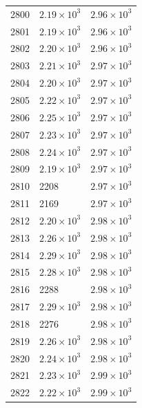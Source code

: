 \begin{table}[H]
\begin{tabular}{lll}
2800 & $\displaystyle 2.19 \times 10^{3}$ & $\displaystyle 2.96 \times 10^{3}$ \\
2801 & $\displaystyle 2.19 \times 10^{3}$ & $\displaystyle 2.96 \times 10^{3}$ \\
2802 & $\displaystyle 2.20 \times 10^{3}$ & $\displaystyle 2.96 \times 10^{3}$ \\
2803 & $\displaystyle 2.21 \times 10^{3}$ & $\displaystyle 2.97 \times 10^{3}$ \\
2804 & $\displaystyle 2.20 \times 10^{3}$ & $\displaystyle 2.97 \times 10^{3}$ \\
2805 & $\displaystyle 2.22 \times 10^{3}$ & $\displaystyle 2.97 \times 10^{3}$ \\
2806 & $\displaystyle 2.25 \times 10^{3}$ & $\displaystyle 2.97 \times 10^{3}$ \\
2807 & $\displaystyle 2.23 \times 10^{3}$ & $\displaystyle 2.97 \times 10^{3}$ \\
2808 & $\displaystyle 2.24 \times 10^{3}$ & $\displaystyle 2.97 \times 10^{3}$ \\
2809 & $\displaystyle 2.19 \times 10^{3}$ & $\displaystyle 2.97 \times 10^{3}$ \\
2810 & 2208 & $\displaystyle 2.97 \times 10^{3}$ \\
2811 & 2169 & $\displaystyle 2.97 \times 10^{3}$ \\
2812 & $\displaystyle 2.20 \times 10^{3}$ & $\displaystyle 2.98 \times 10^{3}$ \\
2813 & $\displaystyle 2.26 \times 10^{3}$ & $\displaystyle 2.98 \times 10^{3}$ \\
2814 & $\displaystyle 2.29 \times 10^{3}$ & $\displaystyle 2.98 \times 10^{3}$ \\
2815 & $\displaystyle 2.28 \times 10^{3}$ & $\displaystyle 2.98 \times 10^{3}$ \\
2816 & 2288 & $\displaystyle 2.98 \times 10^{3}$ \\
2817 & $\displaystyle 2.29 \times 10^{3}$ & $\displaystyle 2.98 \times 10^{3}$ \\
2818 & 2276 & $\displaystyle 2.98 \times 10^{3}$ \\
2819 & $\displaystyle 2.26 \times 10^{3}$ & $\displaystyle 2.98 \times 10^{3}$ \\
2820 & $\displaystyle 2.24 \times 10^{3}$ & $\displaystyle 2.98 \times 10^{3}$ \\
2821 & $\displaystyle 2.23 \times 10^{3}$ & $\displaystyle 2.99 \times 10^{3}$ \\
2822 & $\displaystyle 2.22 \times 10^{3}$ & $\displaystyle 2.99 \times 10^{3}$ \\

\end{tabular}
\end{table}
